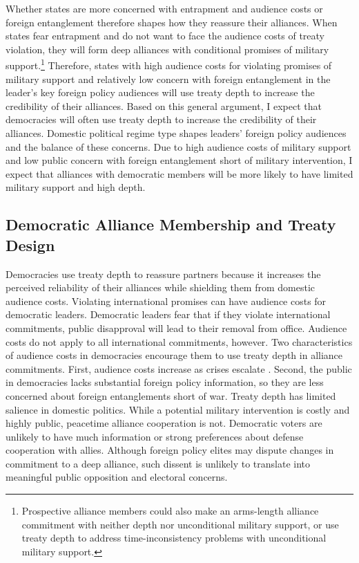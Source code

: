 \documentclass[12pt]{article}
\begin{document}
Whether states are more concerned with entrapment and audience costs or foreign entanglement therefore shapes how they reassure their alliances. 
When states fear entrapment and do not want to face the audience costs of treaty violation, they will form deep alliances with conditional promises of military support.\footnote{Prospective alliance members could also make an arms-length alliance commitment with neither depth nor unconditional military support, or use treaty depth to address time-inconsistency problems with unconditional military support.}
Therefore, states with high audience costs for violating promises of military support and relatively low concern with foreign entanglement in the leader's key foreign policy audiences will use treaty depth to increase the credibility of their alliances. 
Based on this general argument, I expect that democracies will often use treaty depth to increase the credibility of their alliances. 
Domestic political regime type shapes leaders' foreign policy audiences and the balance of these concerns. 
Due to high audience costs of military support and low public concern with foreign entanglement short of military intervention, I expect that alliances with democratic members will be more likely to have limited military support and high depth. 



\subsection{Democratic Alliance Membership and Treaty Design}


Democracies use treaty depth to reassure partners because it increases the perceived reliability of their alliances while shielding them from domestic audience costs. 
Violating international promises can have audience costs for democratic leaders.
Democratic leaders fear that if they violate international commitments, public disapproval will lead to their removal from office.  
Audience costs do not apply to all international commitments, however. 
Two characteristics of audience costs in democracies encourage them to use treaty depth in alliance commitments.  
First, audience costs increase as crises escalate \citep{Tomz2007}. 
Second, the public in democracies lacks substantial foreign policy information, so they are less concerned about foreign entanglements short of war.
Treaty depth has limited salience in domestic politics. 
While a potential military intervention is costly and highly public, peacetime alliance cooperation is not.  
Democratic voters are unlikely to have much information or strong preferences about defense cooperation with allies. 
Although foreign policy elites may dispute changes in commitment to a deep alliance, such dissent is unlikely to translate 
into meaningful public opposition and electoral concerns.
\end{document}
